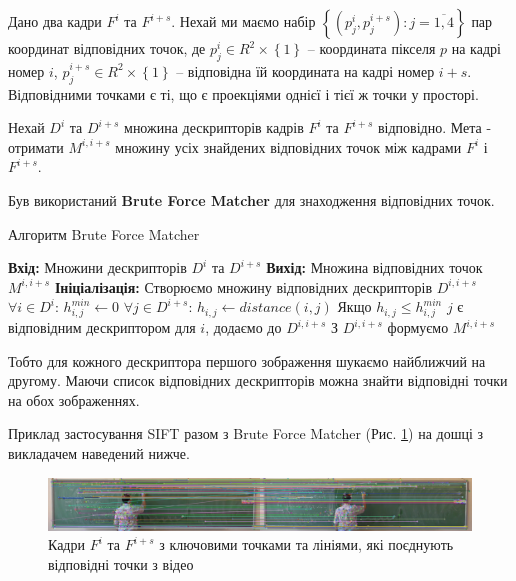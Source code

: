 Дано два кадри \(F^{i}\) та \(F^{i + s}\). Нехай ми маємо набір
\(\left\{ \left( p_{j}^{i},p_{j}^{i + s} \right):j = \overline{1,4} \right\}\)
пар координат відповідних точок, де
\(p_{j}^{i} \in R^{2} \times \left\{ 1 \right\}\) -- координата пікселя
\(p\) на кадрі номер \(i\),
\(p_{j}^{i + s} \in R^{2} \times \left\{ 1 \right\}\) -- відповідна їй
координата на кадрі номер \(i + s\). Відповідними точками є ті, що є
проекціями однієї і тієї ж точки у просторі.

Нехай $D^i$ та $D^{i+s}$ множина дескрипторів кадрів \(F^{i}\) та \(F^{i + s}\)
відповідно. Мета - отримати \(M^{i,i+s}\) множину усіх знайдених відповідних точок  між кадрами
\(F^{i}\) і \(F^{i + s}\).


Був використаний \textbf{Brute Force Matcher} для знаходження відповідних точок.
\begin{algorithm}[H]
    \caption{Алгоритм Brute Force Matcher}
    \begin{algorithmic}
        \State \textbf{Вхід:} Множини дескрипторів $D^i$ та $D^{i+s}$
        \State \textbf{Вихід:} Множина відповідних точок \(M^{i,i+s}\)
        \State \textbf{Ініціалізація:} Створюємо множину відповідних дескрипторів $D^{i,i+s}$
        \State $\forall i \in D^i$:
        \State  \qquad $h^{min}_{i,j} \gets 0$
        \State  \qquad  $\forall j \in D^{i+s}$:
        \State  \qquad \qquad  $h_{i,j} \gets distance(i,j)$
        \State  \qquad \qquad  Якщо {$h_{i,j} \leq h^{min}_{i,j}$}
        \State  \qquad \qquad  \qquad $j$ є відповідним  дескриптором для $i$, додаємо до  $D^{i,i+s}$
        \State З $D^{i,i+s}$ формуємо \(M^{i,i+s}\)
    \end{algorithmic}
    \label{al:brute-force-matcher}
\end{algorithm}

Тобто для кожного дескриптора першого зображення шукаємо найближчий на другому.
Маючи список відповідних дескрипторів можна знайти відповідні точки на обох зображеннях.

Приклад застосування SIFT разом з Brute Force Matcher (Рис. \ref{fig:matches_img}) на
дошці з викладачем наведений нижче.

\begin{figure}[H]
    \centering
    \includegraphics[width=1\textwidth]{images/matches_img}
    \caption{Кадри $F^i$ та $F^{i+s}$ з ключовими точками та лініями,
        які поєднують відповідні точки з відео \cite{yakovlev_discrete_math_video}
        \label{fig:matches_img}
    }
\end{figure}